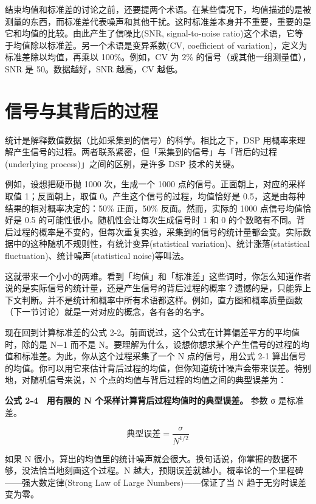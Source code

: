 结束均值和标准差的讨论之前，还要提两个术语。在某些情况下，均值描述的是被测量的东西，而标准差代表噪声和其他干扰。这时标准差本身并不重要，重要的是它和均值的比较。由此产生了信噪比(SNR,
signal-to-noise
ratio)这个术语，它等于均值除以标准差。另一个术语是变异系数(CV,
coefficient of variation)，定义为标准差除以均值，再乘以 100\%。例如，CV
为 2\% 的信号（或其他一组测量值），SNR 是 50。数据越好，SNR 越高，CV
越低。

\section{信号与其背后的过程}

统计是解释数值数据（比如采集到的信号）的科学。相比之下，DSP
用概率来理解产生信号的过程。两者联系紧密，但「采集到的信号」与「背后的过程(underlying
process)」之间的区别，是许多 DSP 技术的关键。

例如，设想把硬币抛 1000 次，生成一个 1000
点的信号。正面朝上，对应的采样取值 1；反面朝上，取值
0。产生这个信号的过程，均值恰好是
0.5，这是由每种结果的相对概率决定的：50\% 正面，50\% 反面。然而，实际的
1000 点信号均值恰好是 0.5 的可能性很小。随机性会让每次生成信号时 1 和 0
的个数略有不同。背后过程的概率是不变的，但每次重复实验，采集到的信号的统计量都会变。实际数据中的这种随机不规则性，有统计变异(statistical
variation)、统计涨落(statistical fluctuation)、统计噪声(statistical
noise)等叫法。

这就带来一个小小的两难。看到「均值」和「标准差」这些词时，你怎么知道作者说的是实际信号的统计量，还是产生信号的背后过程的概率？遗憾的是，只能靠上下文判断。并不是统计和概率中所有术语都这样。例如，直方图和概率质量函数（下一节讨论）就是一对对应的概念，各有各的名字。

现在回到计算标准差的公式
2-2。前面说过，这个公式在计算偏差平方的平均值时，除的是 N−1 而不是
N。要理解为什么，设想你想求某个产生信号的过程的均值和标准差。为此，你从这个过程采集了一个
N 点的信号，用公式 2-1
算出信号的均值。你可以用它来估计背后过程的均值，但你知道统计噪声会带来误差。特别地，对随机信号来说，N
个点的均值与背后过程的均值之间的典型误差为：

\textbf{公式 2-4　用有限的 N 个采样计算背后过程均值时的典型误差。} 参数
σ 是标准差。

\[
\text{典型误差} = \frac{\sigma}{N^{1/2}}
\]

如果 N
很小，算出的均值里的统计噪声就会很大。换句话说，你掌握的数据不够，没法恰当地刻画这个过程。N
越大，预期误差就越小。概率论的一个里程碑------强大数定律(Strong Law of
Large Numbers)------保证了当 N 趋于无穷时误差变为零。

